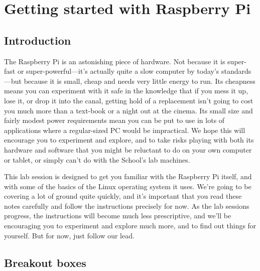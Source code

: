\chapter{Getting started with Raspberry Pi}



\section{Introduction}

The Raspberry Pi is an astonishing piece of hardware. Not because it is super-fast or super-powerful---it's actually quite a slow computer by today's standards---but because it is small, cheap and needs very little energy to run. Its cheapness means you can experiment with it safe in the knowledge that if you mess it up, lose it, or drop it into the canal, getting hold of a replacement isn't going to cost you much more than a text-book or a night out at the cinema. Its small size and fairly modest power requirements mean you can be put to use in lots of applications where a regular-sized PC would be impractical.  We hope this will encourage you to experiment and explore, and to take risks playing with both its hardware and software that you might be reluctant to do on your own computer or tablet, or simply can't do with the School's lab machines. 

This lab session is designed to get you familiar with the Raspberry Pi itself, and with some of the basics of the Linux operating system it uses. We're going to be covering a lot of ground quite quickly, and it's important that you read these notes carefully and follow the instructions precisely for now. As the lab sessions progress, the instructions will become much less prescriptive, and we'll be encouraging you to experiment and explore much more, and to find out things for yourself. But for now, just follow our lead. 

\section{Breakout boxes}

